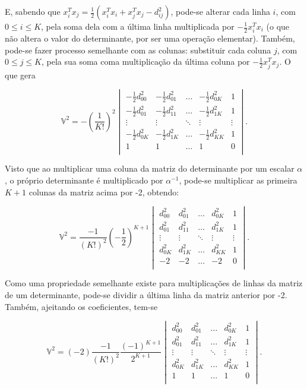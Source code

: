 E, sabendo que $x_i^Tx_j = \frac{1}{2}(x_i^Tx_i + x_j^Tx_j - d_{ij}^2)$, pode-se alterar cada linha $i$, com $0 \leq i\leq K$, pela soma dela com a última linha multiplicada por $-\frac{1}{2}x^T_ix_i$ (o que não altera o valor do determinante, por ser uma operação elementar). Também, pode-se fazer processo semelhante com as colunas: substituir cada coluna $j$, com $0\leq j\leq K$, pela sua soma coma multiplicação da última coluna por $-\frac{1}{2}x^T_jx_j$. O que gera

\begin{equation*}
\mathbb{V}^2 = -\left( \frac{1}{K!}\right)^2 
\begin{vmatrix}
-\frac{1}{2}d^2_{00} & -\frac{1}{2}d^2_{01} & \ldots & -\frac{1}{2}d^2_{0K} & 1\\ 
-\frac{1}{2}d^2_{01} & -\frac{1}{2}d^2_{11} & \ldots & -\frac{1}{2}d^2_{1K} & 1\\ 
\vdots & \vdots & \ddots & \vdots & \vdots \\ 
-\frac{1}{2}d^2_{0K} & -\frac{1}{2}d^2_{1K} & \ldots & -\frac{1}{2}d^2_{KK} & 1\\
1 & 1 & \ldots & 1 & 0\\ 
\end{vmatrix}.
\end{equation*}

Visto que ao multiplicar uma coluna da matriz do determinante por um escalar $\alpha$, o próprio determinante é multiplicado por $\alpha^{-1}$, pode-se multiplicar as primeira $K+1$ colunas da matriz acima por -2, obtendo:

\begin{equation*}
\mathbb{V}^2 = \frac{-1}{(K!)^2}\left( -\frac{1}{2}\right)^{K+1} 
\begin{vmatrix}
d^2_{00} & d^2_{01} & \ldots & d^2_{0K} & 1\\ 
d^2_{01} & d^2_{11} & \ldots & d^2_{1K} & 1\\ 
\vdots & \vdots & \ddots & \vdots & \vdots \\ 
d^2_{0K} & d^2_{1K} & \ldots & d^2_{KK} & 1\\
-2 & -2 & \ldots & -2 & 0\\ 
\end{vmatrix}.
\end{equation*}

Como uma propriedade semelhante existe para multiplicações de linhas da matriz de um determinante, pode-se dividir a última linha da matriz anterior por -2. Também, ajeitando os coeficientes, tem-se

\begin{equation*}
\mathbb{V}^2 = (-2) \frac{-1}{(K!)^2}\frac{(-1)^{K+1}}{2^{K+1}} 
\begin{vmatrix}
d^2_{00} & d^2_{01} & \ldots & d^2_{0K} & 1\\ 
d^2_{01} & d^2_{11} & \ldots & d^2_{1K} & 1\\ 
\vdots & \vdots & \ddots & \vdots & \vdots \\ 
d^2_{0K} & d^2_{1K} & \ldots & d^2_{KK} & 1\\
1 & 1 & \ldots & 1 & 0\\ 
\end{vmatrix}.
\end{equation*}


